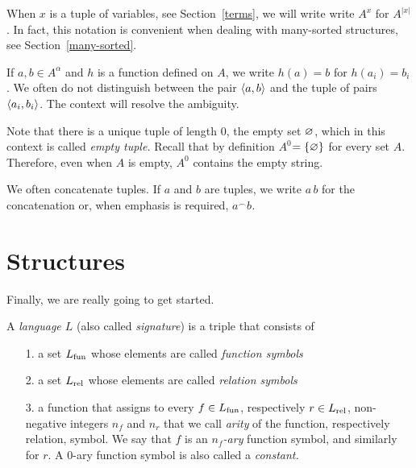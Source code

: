When $x$ is a tuple of variables, see Section~\ref{terms}, we will write write \emph{$A^{x}$\/} for $A^{|x|}$.
In fact, this notation is convenient when dealing with many-sorted structures, see Section~\ref{many-sorted}.

If $a,b\in A^{\alpha}$ and $h$ is a function defined on $A$, we write $h(a)=b$ for $h(a_i)=b_i$.
We often do not distinguish between the pair $\langle a,b\rangle$ and the tuple of pairs $\langle a_i,b_i\rangle$.
The context will resolve the ambiguity.

Note that there is a unique tuple of length $0$, the empty set $\varnothing$, which in this context is called \emph{empty tuple.}
Recall that by definition \emph{$A^{0}$\/}$=\{\varnothing\}$ for every set $A$.
Therefore, even when $A$ is empty, $A^{0}$ contains the empty string.

We often concatenate tuples.
If $a$ and $b$ are tuples, we write \emph{$a\,b$\/} for the concatenation or, when emphasis is required, \emph{$a^\frown b$.}

\section{Structures}
Finally, we are really going to get started.

\begin{definition}
A \emph{language $L$\/} (also called \emph{signature\/}) is a triple that consists of
\begin{itemize}
\item[1.] a set \emph{$L_{\rm fun}$} whose elements are called \emph{function symbols}
\item[2.] a set \emph{$L_{\rm rel}$\/} whose elements are called \emph{relation symbols}
\item[3.] a function that assigns to every $f\in L_{\rm fun}$, respectively $r\in L_{\rm rel}$, non-negative integers $n_f$ and $n_r$ that we call \emph{arity\/} of the function, respectively relation, symbol.
We say that $f$ is an \emph{$n_f$-ary} function symbol, and similarly for $r$.
A $0$-ary function symbol is also called a \emph{constant.}
\end{itemize}
\end{definition}

